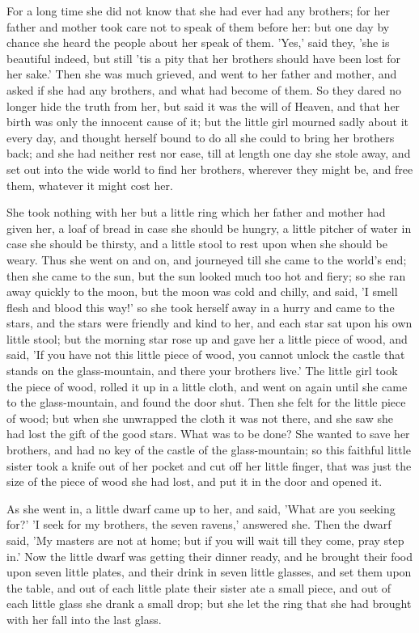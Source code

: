 \documentclass[12pt]{book}
\begin{document}
For a long time she did not know that she had ever had any brothers;
for her father and mother took care not to speak of them before her:
but one day by chance she heard the people about her speak of them.
'Yes,' said they, 'she is beautiful indeed, but still 'tis a pity that
her brothers should have been lost for her sake.' Then she was much
grieved, and went to her father and mother, and asked if she had any
brothers, and what had become of them. So they dared no longer hide
the truth from her, but said it was the will of Heaven, and that her
birth was only the innocent cause of it; but the little girl mourned
sadly about it every day, and thought herself bound to do all she
could to bring her brothers back; and she had neither rest nor ease,
till at length one day she stole away, and set out into the wide world
to find her brothers, wherever they might be, and free them, whatever
it might cost her.

She took nothing with her but a little ring which her father and
mother had given her, a loaf of bread in case she should be hungry, a
little pitcher of water in case she should be thirsty, and a little
stool to rest upon when she should be weary. Thus she went on and on,
and journeyed till she came to the world's end; then she came to the
sun, but the sun looked much too hot and fiery; so she ran away
quickly to the moon, but the moon was cold and chilly, and said, 'I
smell flesh and blood this way!' so she took herself away in a hurry
and came to the stars, and the stars were friendly and kind to her,
and each star sat upon his own little stool; but the morning star rose
up and gave her a little piece of wood, and said, 'If you have not
this little piece of wood, you cannot unlock the castle that stands on
the glass-mountain, and there your brothers live.' The little girl
took the piece of wood, rolled it up in a little cloth, and went on
again until she came to the glass-mountain, and found the door shut.
Then she felt for the little piece of wood; but when she unwrapped the
cloth it was not there, and she saw she had lost the gift of the good
stars. What was to be done? She wanted to save her brothers, and had
no key of the castle of the glass-mountain; so this faithful little
sister took a knife out of her pocket and cut off her little finger,
that was just the size of the piece of wood she had lost, and put it
in the door and opened it.

As she went in, a little dwarf came up to her, and said, 'What are you
seeking for?' 'I seek for my brothers, the seven ravens,' answered
she. Then the dwarf said, 'My masters are not at home; but if you will
wait till they come, pray step in.' Now the little dwarf was getting
their dinner ready, and he brought their food upon seven little
plates, and their drink in seven little glasses, and set them upon the
table, and out of each little plate their sister ate a small piece,
and out of each little glass she drank a small drop; but she let the
ring that she had brought with her fall into the last glass.
\end{document}
